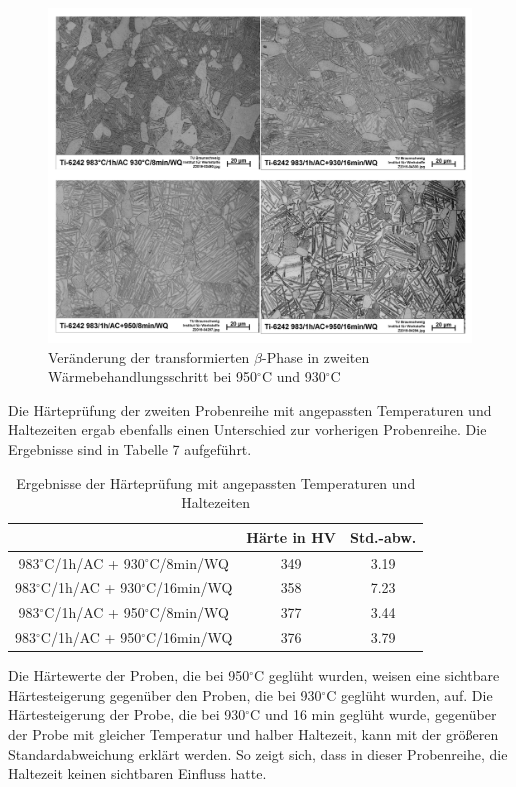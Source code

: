 \begin{figure}[h]
\centering
\includegraphics[width=0.9\linewidth]{"Bilder/Abbildung 15"}
\caption[Abbildung 15]{Veränderung der transformierten $\beta$-Phase in zweiten Wärmebehandlungsschritt bei 950$^\circ$C und 930$^\circ$C}
\label{fig:abbildung-15}
\end{figure}

Die Härteprüfung der zweiten Probenreihe mit angepassten Temperaturen und Haltezeiten ergab ebenfalls einen Unterschied zur vorherigen Probenreihe. Die Ergebnisse sind in Tabelle 7 aufgeführt.

\begin{table}[h]
\centering
\begin{tabular}{|c|c|c|}
\hline 
& Härte in HV &  Std.-abw. \\ 
\hline 
983$^\circ$C/1h/AC + 930$^\circ$C/8min/WQ & 349 & 3.19 \\ 
\hline 
983$^\circ$C/1h/AC + 930$^\circ$C/16min/WQ & 358 & 7.23 \\ 
\hline 
983$^\circ$C/1h/AC + 950$^\circ$C/8min/WQ & 377 & 3.44 \\ 
\hline 
983$^\circ$C/1h/AC + 950$^\circ$C/16min/WQ & 376 & 3.79 \\ 
\hline 
\end{tabular} 
\caption{Ergebnisse der Härteprüfung mit angepassten Temperaturen und Haltezeiten}
\label{Tabelle 7}
\end{table}

Die Härtewerte der Proben, die bei 950$^\circ$C geglüht wurden, weisen eine sichtbare Härtesteigerung gegenüber den Proben, die bei 930$^\circ$C geglüht wurden, auf. Die Härtesteigerung der Probe, die bei 930$^\circ$C und 16 min geglüht wurde, gegenüber der Probe mit gleicher Temperatur und halber Haltezeit, kann mit der größeren Standardabweichung erklärt werden. So zeigt sich, dass in dieser Probenreihe, die Haltezeit keinen sichtbaren Einfluss hatte.

